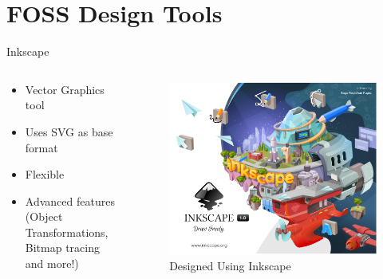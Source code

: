 \documentclass[presentation]{beamer}
\begin{document}
\section*{FOSS Design Tools}
\label{sec:org42e0d37}
\begin{frame}[label={sec:orge1d76f0}]{Inkscape}
\begin{columns}
\begin{column}{0.5\columnwidth}
\begin{itemize}
\item Vector Graphics tool
\item Uses SVG as base format
\item Flexible
\item Advanced features (Object Transformations, Bitmap tracing and more!)
\end{itemize}
\end{column}
\begin{column}{0.5\columnwidth}
\begin{figure}[htbp]
\centering
\includegraphics[width=.9\linewidth]{./images/inkscape.png}
\caption{Designed Using Inkscape}
\end{figure}
\end{column}
\end{columns}
\end{frame}
\end{document}
